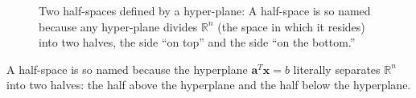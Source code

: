 \begin{example}
\begin{figure}[htbp]
\caption{Two half-spaces defined by a hyper-plane: A half-space is so named because any hyper-plane divides $\mathbb{R}^n$ (the space in which it resides) into two halves, the side ``on top'' and the side ``on the bottom.''}
\label{fig:HalfSpace}
\end{figure}
A half-space is so named because the hyperplane $\mathbf{a}^T\mathbf{x} = b$ literally separates $\mathbb{R}^n$ into two halves: the half above the hyperplane and the half below the hyperplane.
\end{example}

